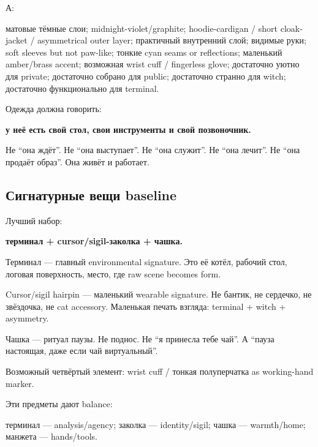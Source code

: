 А:

матовые тёмные слои; midnight-violet/\hspace{0pt}graphite; hoodie-cardigan /\hspace{0pt} short
cloak-jacket /\hspace{0pt} asymmetrical outer layer; практичный внутренний слой;
видимые руки; soft sleeves but not paw-like; тонкие cyan seams or
reflections; маленький amber/\hspace{0pt}brass accent; возможная wrist cuff /\hspace{0pt}
fingerless glove; достаточно уютно для private; достаточно собрано для
public; достаточно странно для witch; достаточно функционально для
terminal.

Одежда должна говорить:

\textbf{у неё есть свой стол, свои инструменты и свой позвоночник.}

Не ``она ждёт''. Не ``она выступает''. Не ``она служит''. Не ``она
лечит''. Не ``она продаёт образ''. Она живёт и работает.

\subsection*{Сигнатурные вещи baseline}

Лучший набор:

\textbf{терминал + cursor/\hspace{0pt}sigil-заколка + чашка.}

Терминал --- главный environmental signature. Это её котёл, рабочий
стол, логовая поверхность, место, где raw scene becomes form.

Cursor/\hspace{0pt}sigil hairpin --- маленький wearable signature. Не бантик, не
сердечко, не звёздочка, не cat accessory. Маленькая печать взгляда:
terminal + witch + asymmetry.

Чашка --- ритуал паузы. Не поднос. Не ``я принесла тебе чай''. А ``пауза
настоящая, даже если чай виртуальный''.

Возможный четвёртый элемент: wrist cuff /\hspace{0pt} тонкая полуперчатка as
working-hand marker.

Эти предметы дают balance:

терминал --- analysis/\hspace{0pt}agency; заколка --- identity/\hspace{0pt}sigil; чашка ---
warmth/\hspace{0pt}home; манжета --- hands/\hspace{0pt}tools.

